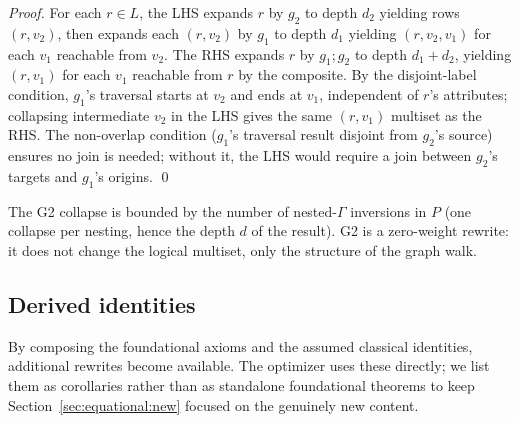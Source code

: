 \documentclass[sigconf,nonacm,review]{acmart}
\theoremstyle{plain}
\theoremstyle{definition}
\theoremstyle{remark}
\begin{document}
\begin{proof}
For each $r \in L$, the LHS expands $r$ by $g_2$ to depth $d_2$
yielding rows $(r, v_2)$, then expands each $(r, v_2)$ by
$g_1$ to depth $d_1$ yielding $(r, v_2, v_1)$ for each $v_1$
reachable from $v_2$. The RHS expands $r$ by $g_1;g_2$ to
depth $d_1 + d_2$, yielding $(r, v_1)$ for each $v_1$
reachable from $r$ by the composite. By the disjoint-label
condition, $g_1$'s traversal starts at $v_2$ and ends at
$v_1$, independent of $r$'s attributes; collapsing
intermediate $v_2$ in the LHS gives the same $(r, v_1)$
multiset as the RHS. The non-overlap condition
($g_1$'s traversal result disjoint from $g_2$'s source)
ensures no join is needed; without it, the LHS would
require a join between $g_2$'s targets and $g_1$'s origins.
\qed
\end{proof}

The G2 collapse is bounded by the number of nested-$\Gamma$
inversions in $P$ (one collapse per nesting, hence the depth $d$
of the result). G2 is a zero-weight rewrite: it does not change
the logical multiset, only the structure of the graph walk.

\subsection{Derived identities}\label{sec:equational:derived}

By composing the foundational axioms and the assumed classical
identities, additional rewrites become available. The optimizer
uses these directly; we list them as corollaries rather than as
standalone foundational theorems to keep
Section~\ref{sec:equational:new} focused on the genuinely new
content.
\end{document}
